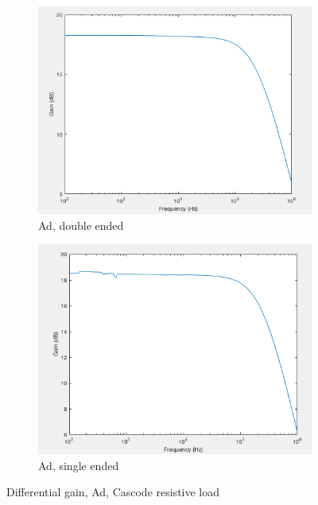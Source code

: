 \begin{figure}[H]
    \centering
    \begin{subfigure}[b]{0.45\textwidth}
        \centering
        \includegraphics[width=\textwidth]{ExperimentalImplementation/Ad_cascode_res_double.png}
        \caption{Ad, double ended}
        \label{fig:blue_led}
    \end{subfigure}
    \hfill
    \begin{subfigure}[b]{0.45\textwidth}
        \centering
        \includegraphics[width=\textwidth]{ExperimentalImplementation/Ad_cascode_res_single.png}
        \caption{Ad, single ended}
        \label{fig:blue_led}
    \end{subfigure}
    \caption{Differential gain, Ad, Cascode resistive load}
    \label{fig:resloadAd}
\end{figure} 

